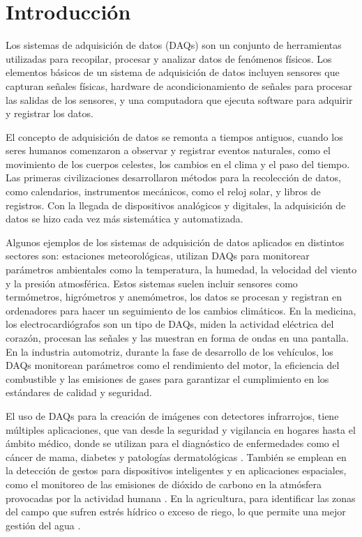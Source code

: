 \chapter{Introducción}

Los sistemas de adquisición de datos (DAQs) son un conjunto de herramientas utilizadas para recopilar, procesar y analizar datos de fenómenos físicos. Los elementos básicos de un sistema de adquisición de datos incluyen sensores que capturan señales físicas, hardware de acondicionamiento de señales para procesar las salidas de los sensores, y una computadora que ejecuta software para adquirir y registrar los datos. 


El concepto de adquisición de datos se remonta a tiempos antiguos, cuando los seres humanos comenzaron a observar y registrar eventos naturales, como el movimiento de los cuerpos celestes, los cambios en el clima y el paso del tiempo. Las primeras civilizaciones desarrollaron métodos para la recolección de datos, como calendarios, instrumentos mecánicos, como el reloj solar, y libros de registros. Con la llegada de dispositivos analógicos y digitales, la adquisición de datos se hizo cada vez más sistemática y automatizada.


Algunos ejemplos de los sistemas de adquisición de datos aplicados en distintos sectores son: estaciones meteorológicas, utilizan DAQs para monitorear parámetros ambientales como la temperatura, la humedad, la velocidad del viento y la presión atmosférica. Estos sistemas suelen incluir sensores como termómetros, higrómetros y anemómetros, los datos se procesan y registran en ordenadores para hacer un seguimiento de los cambios climáticos. En la medicina, los electrocardiógrafos son un tipo de DAQs, miden la actividad eléctrica del corazón, procesan las señales y las muestran en forma de ondas en una pantalla. En la industria automotriz, durante la fase de desarrollo de los vehículos, los DAQs monitorean parámetros como el rendimiento del motor, la eficiencia del combustible y las emisiones de gases para garantizar el cumplimiento en los estándares de calidad y seguridad.


El uso de DAQs para la creación de imágenes con detectores infrarrojos, tiene múltiples aplicaciones, que van desde la seguridad y vigilancia en hogares \cite{Yii2023} hasta el ámbito médico, donde se utilizan para el diagnóstico de enfermedades como el cáncer de mama, diabetes \cite{LeneroBardallo2022} y patologías dermatológicas \cite{She2024}. También se emplean en la detección de gestos para dispositivos inteligentes \cite{LeBa2019} y en aplicaciones espaciales, como el monitoreo de las emisiones de dióxido de carbono en la atmósfera provocadas por la actividad humana \cite{Minoglou2019}. En la agricultura, para identificar las zonas del campo que sufren estrés hídrico o exceso de riego, lo que permite una mejor gestión del agua \cite{Parihar2021}.


